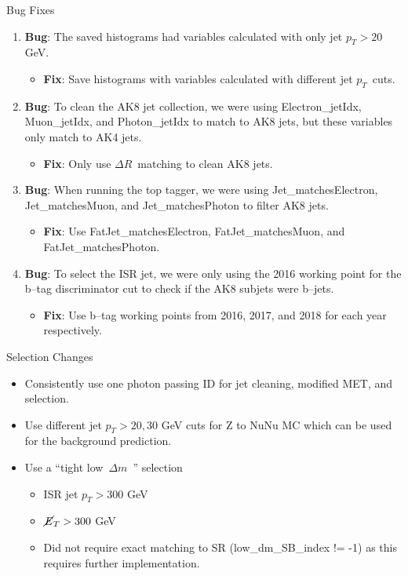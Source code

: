\documentclass[10pt,xcolor=svgnames,fleqn,aspectratio=169]{beamer}
\newcommand{\dr}{$\Delta R$~}
\newcommand{\pt}{$p_{T}$~}
\newcommand{\lowdm}{low~$\Delta m$~}
\newcommand{\bug}{\textbf{Bug}}
\newcommand{\fix}{\textbf{Fix}}
\begin{document}
\begin{frame}{Bug Fixes}
\begin{enumerate}
\item \bug: The saved histograms had variables calculated with only jet $p_{T} > 20$ GeV.
\begin{itemize}
\item \fix: Save histograms with variables calculated with different jet \pt cuts.
\end{itemize}
\item \bug: To clean the AK8 jet collection, we were using Electron\_jetIdx, Muon\_jetIdx, and Photon\_jetIdx to match to AK8 jets, but these variables only match to AK4 jets.
\begin{itemize}
\item \fix: Only use \dr matching to clean AK8 jets.
\end{itemize}
\item \bug: When running the top tagger, we were using Jet\_matchesElectron, Jet\_matchesMuon, and Jet\_matchesPhoton to filter AK8 jets.
\begin{itemize}
\item \fix: Use FatJet\_matchesElectron, FatJet\_matchesMuon, and FatJet\_matchesPhoton.
\end{itemize}
\item \bug: To select the ISR jet, we were only using the 2016 working point for the b--tag discriminator cut to check if the AK8 subjets were b--jets.
\begin{itemize}
\item \fix: Use b--tag working points from 2016, 2017, and 2018 for each year respectively.
\end{itemize}
\end{enumerate}
\end{frame}

\begin{frame}{Selection Changes}
\begin{itemize}
\item Consistently use one photon passing ID for jet cleaning, modified MET, and selection.
\item Use different jet $p_T > 20, 30$ GeV cuts for Z to NuNu MC which can be used for the background prediction.
\item Use a ``tight \lowdm'' selection
\begin{itemize}
\item ISR jet $p_{T} > 300$ GeV
\item $\cancel{E}_{T} > 300$ GeV
\item Did not require exact matching to SR (low\_dm\_SB\_index != -1) as this requires further implementation.
\end{itemize}
\end{itemize}
\end{frame}
\end{document}
